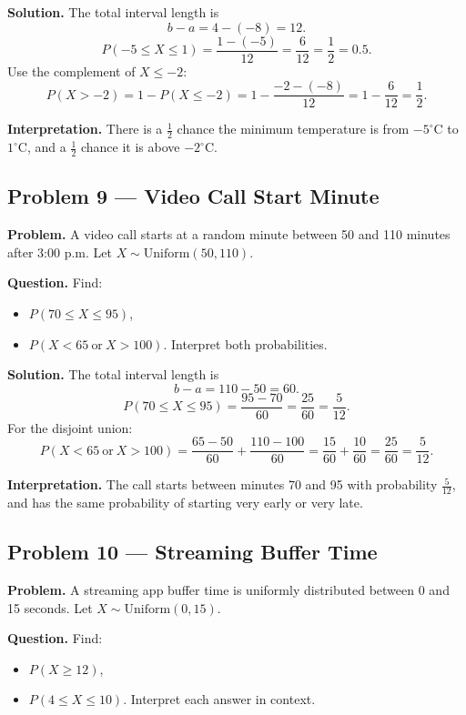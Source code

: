 \begin{ExamProblems}
\textbf{Solution.}
The total interval length is
\[
b-a=4-(-8)=12.
\]
\[
P(-5\le X\le 1)=\frac{1-(-5)}{12}=\frac{6}{12}=\frac{1}{2}=0.5.
\]
Use the complement of $X\le -2$:
\[
P(X>-2)=1-P(X\le -2)=1-\frac{-2-(-8)}{12}=1-\frac{6}{12}=\frac{1}{2}.
\]

\textbf{Interpretation.}
There is a $\frac{1}{2}$ chance the minimum temperature is from $-5^\circ$C to $1^\circ$C, and a $\frac{1}{2}$ chance it is above $-2^\circ$C.


\item
\subsection*{Problem 9 — Video Call Start Minute}

\textbf{Problem.}
A video call starts at a random minute between 50 and 110 minutes after 3:00 p.m.
Let $X\sim \text{Uniform}(50,110)$.

\textbf{Question.}
Find:
\begin{itemize}
    \item[(a)] $P(70\le X\le 95)$,
    \item[(b)] $P(X<65\ \text{or}\ X>100)$.
Interpret both probabilities.
\end{itemize}

\textbf{Solution.}
The total interval length is
\[
b-a=110-50=60.
\]
\[
P(70\le X\le 95)=\frac{95-70}{60}=\frac{25}{60}=\frac{5}{12}.
\]
For the disjoint union:
\[
P(X<65\ \text{or}\ X>100)=\frac{65-50}{60}+\frac{110-100}{60}=\frac{15}{60}+\frac{10}{60}=\frac{25}{60}=\frac{5}{12}.
\]

\textbf{Interpretation.}
The call starts between minutes 70 and 95 with probability $\frac{5}{12}$, and has the same probability of starting very early or very late.


\item
\subsection*{Problem 10 — Streaming Buffer Time}

\textbf{Problem.}
A streaming app buffer time is uniformly distributed between 0 and 15 seconds.
Let $X\sim \text{Uniform}(0,15)$.

\textbf{Question.}
Find:
\begin{itemize}
    \item[(a)] $P(X\ge 12)$,
    \item[(b)] $P(4\le X\le 10)$.
Interpret each answer in context.
\end{itemize}


\end{ExamProblems}
